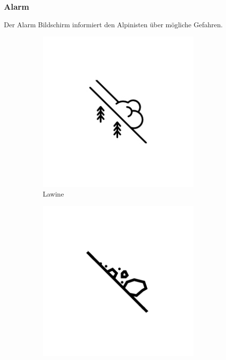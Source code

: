 \documentclass[11pt,english,german]{report}
\theoremstyle{definition}
\begin{document}
\subsubsection{Alarm}
Der Alarm Bildschirm informiert den Alpinisten über mögliche Gefahren.
\begin{figure}[H]
	\centering
	\begin{subfigure}{.25\textwidth}
		\centering
		\includegraphics[width=0.9\textwidth]{img/prototype/avalanche.jpg}
		\caption[Lawine]
		{Lawine}
	\end{subfigure}%
	\begin{subfigure}{.25\textwidth}
		\centering
		\includegraphics[width=0.9\textwidth]{img/prototype/landslide.png}

\end{subfigure}
\end{figure}
\end{document}
